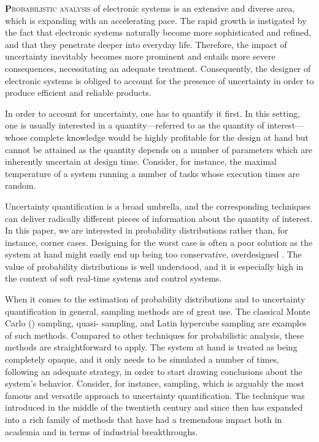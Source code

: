 \lettrine[findent=0.4em, nindent=0em]{\textbf{P}}{robabilistic analysis} of
electronic systems is an extensive and diverse area, which is expanding with an
accelerating pace. The rapid growth is instigated by the fact that electronic
systems naturally become more sophisticated and refined, and that they penetrate
deeper into everyday life. Therefore, the impact of uncertainty inevitably
becomes more prominent and entails more severe consequences, necessitating an
adequate treatment. Consequently, the designer of electronic systems is obliged
to account for the presence of uncertainty in order to produce efficient and
reliable products.

In order to account for uncertainty, one has to quantify it first. In this
setting, one is usually interested in a quantity---referred to as the quantity
of interest---whose complete knowledge would be highly profitable for the design
at hand but cannot be attained as the quantity depends on a number of parameters
which are inherently uncertain at design time. Consider, for instance, the
maximal temperature of a system running a number of tasks whose execution times
are random.

Uncertainty quantification is a broad umbrella, and the corresponding techniques
can deliver radically different pieces of information about the quantity of
interest. In this paper, we are interested in probability distributions rather
than, for instance, corner cases. Designing for the worst case is often a poor
solution as the system at hand might easily end up being too conservative,
overdesigned \cite{quinton2012}. The value of probability distributions is well
understood, and it is especially high in the context of soft real-time systems
and control systems.

When it comes to the estimation of probability distributions and to uncertainty
quantification in general, sampling methods are of great use. The classical
Monte Carlo () sampling, quasi- sampling, and Latin hypercube
sampling are examples of such methods. Compared to other techniques for
probabilistic analysis, these methods are straightforward to apply. The system
at hand is treated as being completely opaque, and it only needs to be simulated
a number of times, following an adequate strategy, in order to start drawing
conclusions about the system's behavior. Consider, for instance, 
sampling, which is arguably the most famous and versatile approach to
uncertainty quantification. The technique was introduced in the middle of the
twentieth century and since then has expanded into a rich family of methods that
have had a tremendous impact both in academia and in terms of industrial
breakthroughs.

